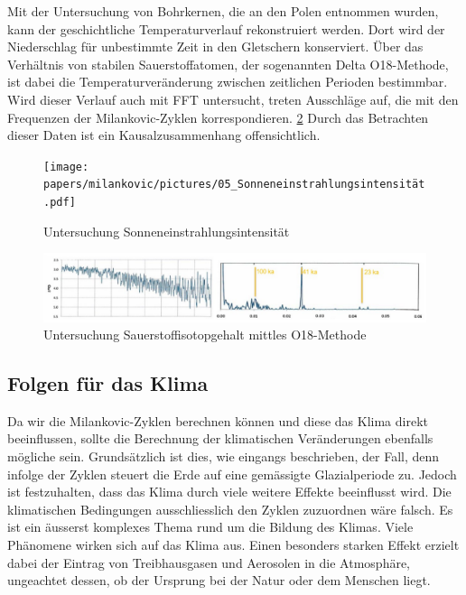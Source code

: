 Mit der Untersuchung von Bohrkernen, die an den Polen entnommen wurden, kann der geschichtliche Temperaturverlauf rekonstruiert werden.
Dort wird der Niederschlag für unbestimmte Zeit in den Gletschern konserviert. Über das Verhältnis von stabilen Sauerstoffatomen, der sogenannten Delta O18-Methode, ist dabei die Temperaturveränderung zwischen zeitlichen Perioden bestimmbar.
Wird dieser Verlauf auch mit FFT untersucht, treten Ausschläge auf, die mit den Frequenzen der Milankovic-Zyklen korrespondieren.
\ref{picture Untersuchung Konzentration}
Durch das Betrachten dieser Daten ist ein Kausalzusammenhang offensichtlich.

\begin{figure}
	\centering
	\texttt{[image: papers/milankovic/pictures/05\_Sonneneinstrahlungsintensität.pdf]}
	\caption{Untersuchung Sonneneinstrahlungsintensität
		\label{picture Untersuchung Sonneneinstrahlungsintensität}}
\end{figure}
\begin{figure}
	\centering
	\includegraphics[width=\linewidth]{papers/milankovic/pictures/06_O18-Konzentration.pdf}
	\caption{Untersuchung Sauerstoffisotopgehalt mittles O18-Methode
		\label{picture Untersuchung Konzentration}}
\end{figure}

\subsection{Folgen für das Klima
	\label{milankovic:subsection:Folgen für das Klima}}
Da wir die Milankovic-Zyklen berechnen können und diese das Klima direkt beeinflussen, sollte die Berechnung der klimatischen Veränderungen ebenfalls mögliche sein.
Grundsätzlich ist dies, wie eingangs beschrieben, der Fall, denn infolge der Zyklen steuert die Erde auf eine gemässigte Glazialperiode zu.
Jedoch ist festzuhalten, dass das Klima durch viele weitere Effekte beeinflusst wird.
Die klimatischen Bedingungen ausschliesslich den Zyklen zuzuordnen wäre falsch.
Es ist ein äusserst komplexes Thema rund um die Bildung des Klimas.
Viele Phänomene wirken sich auf das Klima aus.
Einen besonders starken Effekt erzielt dabei der Eintrag von Treibhausgasen und Aerosolen in die Atmosphäre, ungeachtet dessen, ob der Ursprung bei der Natur oder dem Menschen liegt.

